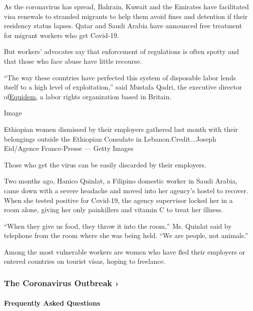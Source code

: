 As the coronavirus has spread, Bahrain, Kuwait and the Emirates have
facilitated visa renewals to stranded migrants to help them avoid fines
and detention if their residency status lapses. Qatar and Saudi Arabia
have announced free treatment for migrant workers who get Covid-19.

But workers' advocates say that enforcement of regulations is often
spotty and that those who face abuse have little recourse.

``The way these countries have perfected this system of disposable labor
lends itself to a high level of exploitation,'' said Mustafa Qadri, the
executive director of\href{https://www.equidemresearch.org/}{Equidem}, a
labor rights organization based in Britain.

Image

Ethiopian women dismissed by their employers gathered last month with
their belongings outside the Ethiopian Consulate in
Lebanon.Credit...Joseph Eid/Agence France-Presse --- Getty Images

Those who get the virus can be easily discarded by their employers.

Two months ago, Hanico Quinlat, a Filipino domestic worker in Saudi
Arabia, came down with a severe headache and moved into her agency's
hostel to recover. When she tested positive for Covid-19, the agency
supervisor locked her in a room alone, giving her only painkillers and
vitamin C to treat her illness.

``When they give us food, they throw it into the room,'' Ms. Quinlat
said by telephone from the room where she was being held. ``We are
people, not animals.''

Among the most vulnerable workers are women who have fled their
employers or entered countries on tourist visas, hoping to freelance.

\href{https://www.nytimes.com/news-event/coronavirus?action=click\&pgtype=Article\&state=default\&region=MAIN_CONTENT_3\&context=storylines_faq}{}

\hypertarget{the-coronavirus-outbreak-}{%
\subsubsection{The Coronavirus Outbreak
›}\label{the-coronavirus-outbreak-}}

\hypertarget{frequently-asked-questions}{%
\paragraph{Frequently Asked
Questions}\label{frequently-asked-questions}}

